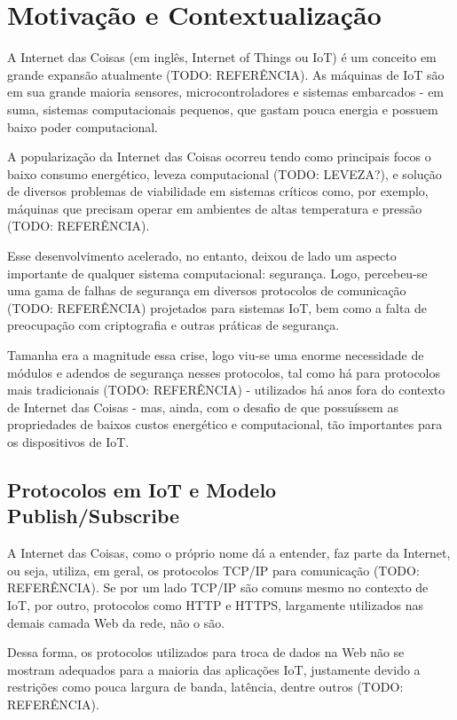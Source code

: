 \section{Motivação e Contextualização}
A Internet das Coisas (em inglês, Internet of Things ou IoT) é um conceito em grande expansão atualmente (TODO: REFERÊNCIA). As máquinas de IoT são em sua grande maioria sensores, microcontroladores e sistemas embarcados \-- em suma, sistemas computacionais pequenos, que gastam pouca energia e possuem baixo poder computacional. 

A popularização da Internet das Coisas ocorreu tendo como principais focos o baixo consumo energético, leveza computacional (TODO: LEVEZA?), e solução de diversos problemas de viabilidade em sistemas críticos como, por exemplo, máquinas que precisam operar em ambientes de altas temperatura e pressão (TODO: REFERÊNCIA).

Esse desenvolvimento acelerado, no entanto, deixou de lado um aspecto importante de qualquer sistema computacional: segurança. Logo, percebeu-se uma gama de falhas de segurança em diversos protocolos de comunicação (TODO: REFERÊNCIA) projetados para sistemas IoT, bem como a falta de preocupação com criptografia e outras práticas de segurança.

Tamanha era a magnitude essa crise, logo viu-se uma enorme necessidade de módulos e adendos de segurança nesses protocolos, tal como há para protocolos mais tradicionais (TODO: REFERÊNCIA) \-- utilizados há anos fora do contexto de Internet das Coisas \-- mas, ainda, com o desafio de que possuíssem as propriedades de baixos custos energético e computacional, tão importantes para os dispositivos de IoT.


\subsection{Protocolos em IoT e Modelo Publish/Subscribe}
A Internet das Coisas, como o próprio nome dá a entender, faz parte da Internet, ou seja, utiliza, em geral, os protocolos TCP/IP para comunicação (TODO: REFERÊNCIA). Se por um lado TCP/IP são comuns mesmo no contexto de IoT, por outro, protocolos como HTTP e HTTPS, largamente utilizados nas demais camada Web da rede, não o são.

Dessa forma, os protocolos utilizados para troca de dados na Web não se mostram adequados para a maioria das aplicações IoT, justamente devido a restrições como pouca largura de banda, latência, dentre outros (TODO: REFERÊNCIA).

